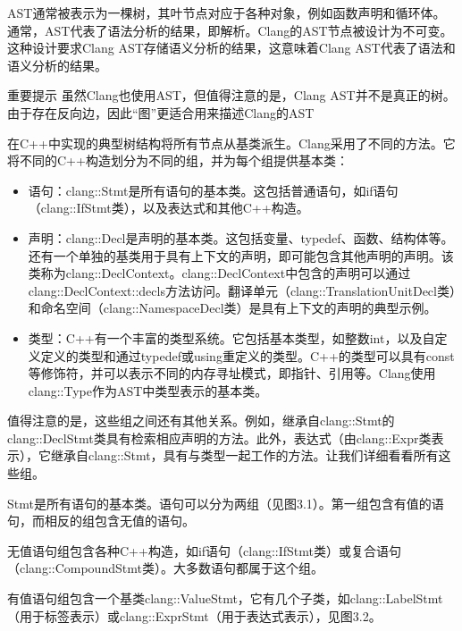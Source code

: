 AST通常被表示为一棵树，其叶节点对应于各种对象，例如函数声明和循环体。通常，AST代表了语法分析的结果，即解析。Clang的AST节点被设计为不可变。这种设计要求Clang AST存储语义分析的结果，这意味着Clang AST代表了语法和语义分析的结果。

\begin{myNotic}{重要提示}
虽然Clang也使用AST，但值得注意的是，Clang AST并不是真正的树。由于存在反向边，因此“图”更适合用来描述Clang的AST
\end{myNotic}

在C++中实现的典型树结构将所有节点从基类派生。Clang采用了不同的方法。它将不同的C++构造划分为不同的组，并为每个组提供基本类：

\begin{itemize}
\item
语句：clang::Stmt是所有语句的基本类。这包括普通语句，如if语句（clang::IfStmt类），以及表达式和其他C++构造。

\item
声明：clang::Decl是声明的基本类。这包括变量、typedef、函数、结构体等。还有一个单独的基类用于具有上下文的声明，即可能包含其他声明的声明。该类称为clang::DeclContext。clang::DeclContext中包含的声明可以通过clang::DeclContext::decls方法访问。翻译单元（clang::TranslationUnitDecl类）和命名空间（clang::NamespaceDecl类）是具有上下文的声明的典型示例。

\item
类型：C++有一个丰富的类型系统。它包括基本类型，如整数int，以及自定义定义的类型和通过typedef或using重定义的类型。C++的类型可以具有const等修饰符，并可以表示不同的内存寻址模式，即指针、引用等。Clang使用clang::Type作为AST中类型表示的基本类。
\end{itemize}

值得注意的是，这些组之间还有其他关系。例如，继承自clang::Stmt的clang::DeclStmt类具有检索相应声明的方法。此外，表达式（由clang::Expr类表示），它继承自clang::Stmt，具有与类型一起工作的方法。让我们详细看看所有这些组。


Stmt是所有语句的基本类。语句可以分为两组（见图3.1）。第一组包含有值的语句，而相反的组包含无值的语句。


无值语句组包含各种C++构造，如if语句（clang::IfStmt类）或复合语句（clang::CompoundStmt类）。大多数语句都属于这个组。

有值语句组包含一个基类clang::ValueStmt，它有几个子类，如clang::LabelStmt（用于标签表示）或clang::ExprStmt（用于表达式表示），见图3.2。

